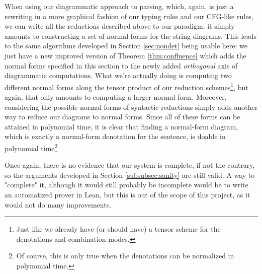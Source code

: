 When using our diagrammatic approach to parsing, which, again, is just a
rewriting in a more graphical fashion of our typing rules and our CFG-like
rules, we can write all the reductions described above to our paradigm:
it simply amounts to constructing a set of normal forms for the string diagrams.
This leads to the same algorithms developed in Section \ref{sec:nondet} being
usable here: we just have a new improved version of Theorem
\ref{thm:confluence} which adds the normal forms specified in this section to
the newly added \emph{orthogonal} axis of diagrammatic computations.
What we're actually doing is computing two different normal forms along the
tensor product of our reduction schemes\footnote{Just like we already have (or
	should have) a tensor scheme for the denotations and combination modes.},
but again, that only amounts to computing a larger normal form.
Moreover, considering the possible normal forms of syntactic reductions simply
adds another way to reduce our diagrams to normal forms.
Since all of these forms can be attained in polynomial time, it is clear that
finding a normal-form diagram, which is exactly a normal-form denotation for
the sentence, is doable in polynomial time\footnote{Of course, this is only
	true when the denotations can be normalized in polynomial time.}

\medskip

Once again, there is no evidence that our system is complete, if not the
contrary, so the arguments developed in Section \ref{subsubsec:sanity} are
still valid.
A way to "complete" it, although it would still probably be incomplete would be
to write an automatized prover in Lean, but this is out of the scope of this
project, as it would not do many improvements.
